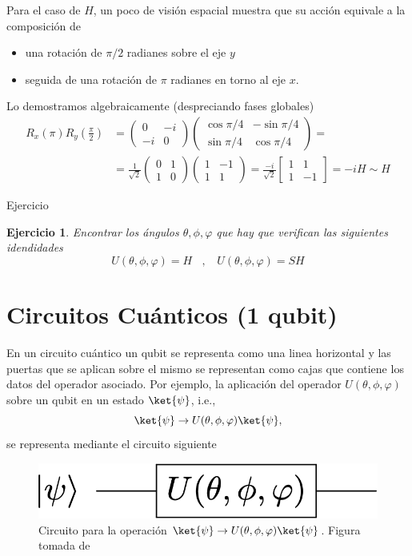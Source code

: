 \documentclass[a4paper,11pt]{book} %
\newtheorem{ejercicio_contador}{Ejercicio}
\newcommand{\Ejercicio}[1]{
		\begin{mybox_gray}{Ejercicio} 
			\begin{ejercicio_contador}
				 #1 
			\end{ejercicio_contador} 
		\end{mybox_gray}
	}
\numberwithin{equation}{chapter}
\def\lp{\left(}
\def\rp{\right)}
\begin{document}
Para el caso de $H$, un poco de visión espacial muestra que su acción equivale a la composición de
\begin{itemize}
	\item una  rotación de $\pi/2$ radianes sobre el eje $y$ 
	\item seguida de una rotación de  $\pi$ radianes en torno al eje $x$.
\end{itemize}
Lo demostramos algebraicamente (despreciando fases globales)       
	\begin{align*}
	R_x(\pi)R_{y}\left(\frac{\pi}{2}\right) & = 
	\lp \begin{matrix}0&-i\\-i&0\end{matrix}  \rp
	\lp \begin{matrix}\cos\pi/4& -\sin\pi/4 \\ \sin\pi/4 & \cos\pi/4 \end{matrix} \rp = \\
	& = \frac{1}{\sqrt{2}} \lp \begin{matrix} 0&1 \\ 1&0 \end{matrix} \rp 
	\lp \begin{matrix}1 & -1 \\ 1 & 1 \end{matrix} \rp  =
	 \frac{-i}{\sqrt{2}} \begin{bmatrix}1&1\\1&-1\end{bmatrix} =-i H \sim H
	\end{align*}

	\Ejercicio{
	Encontrar los ángulos $\theta,\phi,\varphi$ que hay que verifican las siguientes idendidades
	 $$
	 U(\theta,\phi,\varphi) = H ~~~~,~~~~  U(\theta,\phi,\varphi) = SH
	 $$
	 }

  
    \section{Circuitos Cuánticos (1 qubit)}
    
En un circuito cuántico un qubit se representa como una linea horizontal y las puertas que se aplican sobre 
el mismo se representan como cajas que contiene los datos del operador asociado. Por ejemplo, la aplicación del operador $U(\theta,\phi,\varphi)$ sobre un qubit en un estado $\ket{\psi}$, i.e.,
	\begin{equation*}
	\ket{\psi} \to  U(\theta,\phi,\varphi)\ket{\psi},
	\end{equation*}
se representa mediante el circuito siguiente
	\begin{figure}[H]
	\centering 
	\includegraphics[width=0.3\linewidth]{Figuras/Fig_puertas_simples}
	\caption{Circuito para la operación $\ket{\psi} \to  U(\theta,\phi,\varphi)\ket{\psi}$. Figura tomada de \cite{bib_Curso-JMas}}
	\label{Fig_puertas_simples}
	\end{figure}
	
\end{document}
